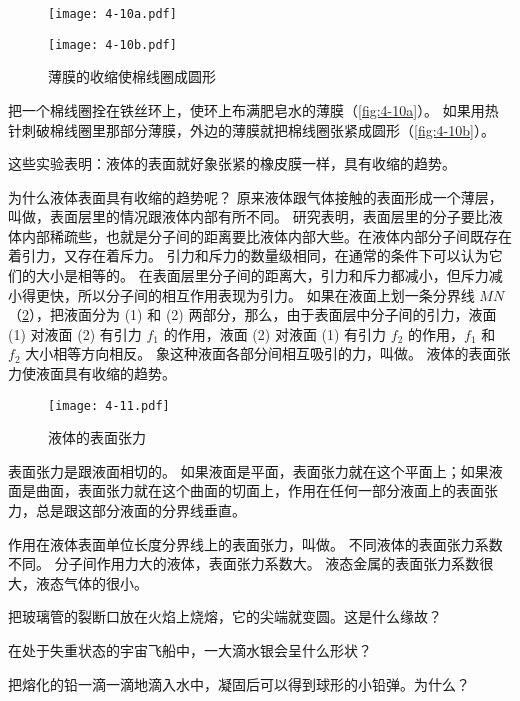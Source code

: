 \begin{figure}
	\begin{minipage}{0.4\linewidth}\centering
		\texttt{[image: 4-10a.pdf]}
	  \subcaption{}\label{fig:4-10a}
	\end{minipage}%
	\begin{minipage}{0.4\linewidth}\centering
		\texttt{[image: 4-10b.pdf]}
	  \subcaption{}\label{fig:4-10b}
	\end{minipage}
	\caption{薄膜的收缩使棉线圈成圆形}\label{fig:4-10}
\end{figure}

把一个棉线圈拴在铁丝环上，使环上布满肥皂水的薄膜（\cref{fig:4-10a}）。
如果用热针刺破棉线圈里那部分薄膜，外边的薄膜就把棉线圈张紧成圆形（\cref{fig:4-10b}）。

这些实验表明：液体的表面就好象张紧的橡皮膜一样，具有收缩的趋势。

为什么液体表面具有收缩的趋势呢？
原来液体跟气体接触的表面形成一个薄层，叫做，表面层里的情况跟液体内部有所不同。
研究表明，表面层里的分子要比液体内部稀疏些，也就是分子间的距离要比液体内部大些。在液体内部分子间既存在着引力，又存在着斥力。
引力和斥力的数量级相同，在通常的条件下可以认为它们的大小是相等的。
在表面层里分子间的距离大，引力和斥力都减小，但斥力减小得更快，所以分子间的相互作用表现为引力。
如果在液面上划一条分界线 $MN$（\cref{fig:4-11}），把液面分为 (1) 和 (2) 两部分，那么，由于表面层中分子间的引力，液面 (1) 对液面 (2) 有引力 $f_1$ 的作用，液面 (2) 对液面 (1) 有引力 $f_2$ 的作用，$f_1$ 和 $f_2$ 大小相等方向相反。
象这种液面各部分间相互吸引的力，叫做。
液体的表面张力使液面具有收缩的趋势。
\begin{figure}
	\texttt{[image: 4-11.pdf]}
	\caption{液体的表面张力}\label{fig:4-11}
\end{figure}

表面张力是跟液面相切的。
如果液面是平面，表面张力就在这个平面上；如果液面是曲面，表面张力就在这个曲面的切面上，作用在任何一部分液面上的表面张力，总是跟这部分液面的分界线垂直。

作用在液体表面单位长度分界线上的表面张力，叫做。
不同液体的表面张力系数不同。
分子间作用力大的液体，表面张力系数大。
液态金属的表面张力系数很大，液态气体的很小。

\begin{Practice}
\begin{question}
	\item 把玻璃管的裂断口放在火焰上烧熔，它的尖端就变圆。这是什么缘故？
	\item 在处于失重状态的宇宙飞船中，一大滴水银会呈什么形状？
	\item 把熔化的铅一滴一滴地滴入水中，凝固后可以得到球形的小铅弹。为什么？
\end{question}
\end{Practice}

